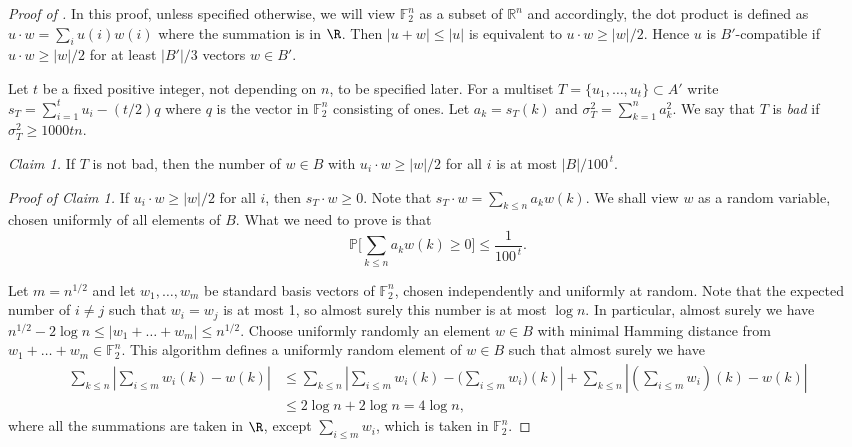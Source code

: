 \documentclass{toc}
\renewcommand\P{\mathbb{P}}
\newcommand\F{\mathbb{F}}
\begin{document}
\begin{proof}[Proof of ]
  In this proof, unless specified otherwise, we will view
  $\mathbb{F}_2^n$ as a subset of $\mathbb{R}^n$ and accordingly, the
  dot product is defined as $u\cdot w=\sum_i u(i)w(i)$ where the
  summation is in $\R$. Then $|u+w|\leq |u|$ is equivalent to
  $u\cdot w\geq |w|/2$. Hence $u$ is $B'$-compatible if
  $u\cdot w\geq |w|/2$ for at least $|B'|/3$ vectors $w\in B'$.
	
  Let $t$ be a fixed positive integer, not depending on $n$, to be
  specified later. For a multiset $T=\{u_1,\dots,u_t\}\subset A'$
  write $s_T=\sum_{i=1}^tu_i-({t}/{2})q$ where $q$ is the vector in
  $\F_2^n$ consisting of ones. Let $a_k=s_T(k)$ and
  $\sigma_T^2=\sum_{k=1}^n a_k^2$. We say that $T$ is \emph{bad} if
  $\sigma_T^2\geq 1000tn$.
	
  \smallskip
	
  \noindent \emph{Claim 1.} If $T$ is not bad, then the number of
  $w\in B$ with $u_i\cdot w\geq |w|/2$ for all $i$ is at most
  ${|B|}/{100^{\,t}}$.
	
  \smallskip
	
  \noindent \emph{Proof of Claim 1.} If $u_i\cdot w\geq |w|/2$ for all
  $i$, then $s_T\cdot w\geq 0$. Note that
  $s_T\cdot w=\sum_{k\leq n} a_kw(k)$. We shall view $w$ as a random
  variable, chosen uniformly of all elements of $B$. What we need to
  prove is that
  \[
    \P\Biggl\lbrack \sum_{k\leq n} a_kw(k)\geq 0\Biggr\rbrack \leq \frac{1}{100^{\,t}}.
  \]
  
  Let $m=n^{1/2}$ and let $w_1,\dots,w_m$ be standard basis vectors of
  $\F_2^n$, chosen independently and uniformly at random. Note that
  the expected number of $i\neq j$ such that $w_i=w_j$ is at most 1,
  so almost surely this number is at most $\log n$. In particular,
  almost surely we have
  $n^{1/2}-2\log n\leq |w_1+\dots+w_m|\leq n^{1/2}$. Choose uniformly
  randomly an element $w\in B$ with minimal Hamming distance from
  $w_1+\dots+w_m\in \F_2^n$. This algorithm defines a uniformly random
  element of $w\in B$ such that almost surely we have
  \begin{align*}
    \sum_{k\leq n}\left|\sum_{i\leq m}w_i(k)-w(k)\right| &\leq \sum_{k\leq n}\left|\sum_{i\leq m}w_i(k)-\Biggl(\sum_{i\leq m}w_i\Biggr)(k)\right|+\sum_{k\leq n}\left|\left(\sum_{i\leq m}w_i\right)(k)-w(k)\right|\\
    &\leq 2\log n+2\log n= 4\log n,
  \end{align*}
  where all the summations are taken in $\R$, except $\sum_{i\leq m} w_i$, which is taken in $\F_2^n$.
  

\end{proof}
\end{document}
